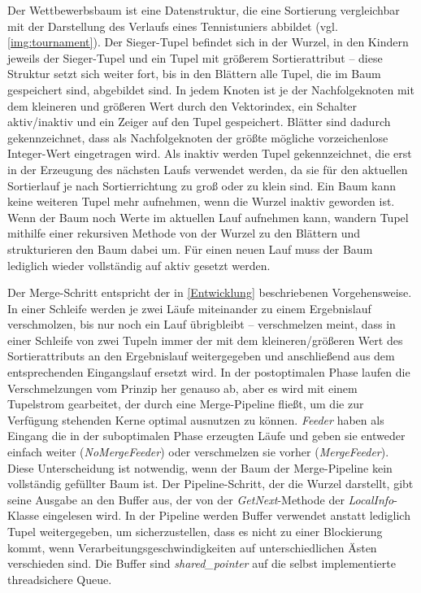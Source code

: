 \documentclass[a4paper,12pt,twoside]{article}
\newcommand{\Fb}[1]{\textit{#1}} %
\begin{document}
{Der Wettbewerbsbaum ist eine Datenstruktur, die eine Sortierung vergleichbar mit der Darstellung des Verlaufs eines Tennistuniers abbildet  (vgl. \autoref{img:tournament}). Der Sieger-Tupel befindet sich in der Wurzel, in den Kindern jeweils der Sieger-Tupel und ein Tupel mit größerem Sortierattribut -- diese Struktur setzt sich weiter fort, bis in den Blättern alle Tupel, die im Baum gespeichert sind, abgebildet sind. In jedem Knoten ist je der Nachfolgeknoten mit dem kleineren und größeren Wert durch den Vektorindex, ein Schalter aktiv/inaktiv und ein Zeiger auf den Tupel gespeichert. Blätter sind dadurch gekennzeichnet, dass als Nachfolgeknoten der größte mögliche vorzeichenlose Integer-Wert eingetragen wird. Als inaktiv werden Tupel gekennzeichnet, die erst in der Erzeugung des nächsten Laufs verwendet werden, da sie für den aktuellen Sortierlauf je nach Sortierrichtung zu groß oder zu klein sind. Ein Baum kann keine weiteren Tupel mehr aufnehmen, wenn die Wurzel inaktiv geworden ist. Wenn der Baum noch Werte im aktuellen Lauf aufnehmen kann, wandern Tupel mithilfe einer rekursiven Methode von der Wurzel zu den Blättern und strukturieren den Baum dabei um. Für einen neuen Lauf muss der Baum lediglich wieder vollständig auf aktiv gesetzt werden. 

Der Merge-Schritt entspricht der in \autoref{Entwicklung} beschriebenen Vorgehensweise. In einer Schleife werden je zwei Läufe miteinander zu einem Ergebnislauf verschmolzen, bis nur noch ein Lauf übrigbleibt -- verschmelzen meint, dass in einer Schleife von zwei Tupeln immer der mit dem kleineren/größeren Wert des Sortierattributs an den Ergebnislauf weitergegeben und anschließend aus dem entsprechenden Eingangslauf ersetzt wird. In der postoptimalen Phase laufen die Verschmelzungen vom Prinzip her genauso ab, aber es wird mit einem Tupelstrom gearbeitet, der durch eine Merge-Pipeline fließt, um die zur Verfügung stehenden Kerne optimal ausnutzen zu können. \Fb{Feeder} haben als Eingang die in der suboptimalen Phase erzeugten Läufe und geben sie entweder einfach weiter (\Fb{NoMergeFeeder}) oder verschmelzen sie vorher (\Fb{MergeFeeder}). Diese Unterscheidung ist notwendig, wenn der Baum der Merge-Pipeline kein vollständig gefüllter Baum ist. Der Pipeline-Schritt, der die Wurzel darstellt, gibt seine Ausgabe an den Buffer aus, der von der \Fb{GetNext}-Methode der \Fb{LocalInfo}-Klasse eingelesen wird. In der Pipeline werden Buffer verwendet anstatt lediglich Tupel weitergegeben, um sicherzustellen, dass es nicht zu einer Blockierung kommt, wenn Verarbeitungsgeschwindigkeiten auf unterschiedlichen Ästen verschieden sind. Die Buffer sind \Fb{shared\_pointer} auf die selbst implementierte threadsichere Queue.  


}
\end{document}
